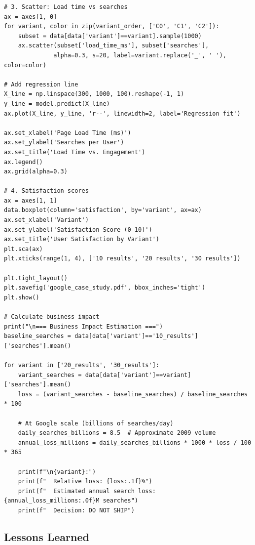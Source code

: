 \begin{lstlisting}
# 3. Scatter: Load time vs searches
ax = axes[1, 0]
for variant, color in zip(variant_order, ['C0', 'C1', 'C2']):
    subset = data[data['variant']==variant].sample(1000)
    ax.scatter(subset['load_time_ms'], subset['searches'],
              alpha=0.3, s=20, label=variant.replace('_', ' '), color=color)

# Add regression line
X_line = np.linspace(300, 1000, 100).reshape(-1, 1)
y_line = model.predict(X_line)
ax.plot(X_line, y_line, 'r--', linewidth=2, label='Regression fit')

ax.set_xlabel('Page Load Time (ms)')
ax.set_ylabel('Searches per User')
ax.set_title('Load Time vs. Engagement')
ax.legend()
ax.grid(alpha=0.3)

# 4. Satisfaction scores
ax = axes[1, 1]
data.boxplot(column='satisfaction', by='variant', ax=ax)
ax.set_xlabel('Variant')
ax.set_ylabel('Satisfaction Score (0-10)')
ax.set_title('User Satisfaction by Variant')
plt.sca(ax)
plt.xticks(range(1, 4), ['10 results', '20 results', '30 results'])

plt.tight_layout()
plt.savefig('google_case_study.pdf', bbox_inches='tight')
plt.show()

# Calculate business impact
print("\n=== Business Impact Estimation ===")
baseline_searches = data[data['variant']=='10_results']['searches'].mean()

for variant in ['20_results', '30_results']:
    variant_searches = data[data['variant']==variant]['searches'].mean()
    loss = (variant_searches - baseline_searches) / baseline_searches * 100

    # At Google scale (billions of searches/day)
    daily_searches_billions = 8.5  # Approximate 2009 volume
    annual_loss_millions = daily_searches_billions * 1000 * loss / 100 * 365

    print(f"\n{variant}:")
    print(f"  Relative loss: {loss:.1f}%")
    print(f"  Estimated annual search loss: {annual_loss_millions:.0f}M searches")
    print(f"  Decision: DO NOT SHIP")
\end{lstlisting}

\subsection{Lessons Learned}

